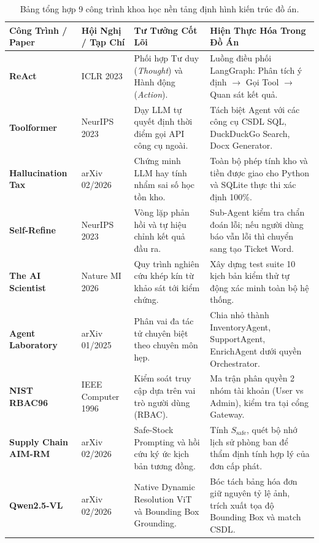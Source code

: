 \documentclass[11pt,a4paper]{article}
\begin{document}
\begin{table}[H]
\centering
\footnotesize
\renewcommand{\arraystretch}{1.2}
\begin{tabularx}{\textwidth}{p{3.2cm} l p{3.8cm} >{\raggedright\arraybackslash}X}
\toprule
\textbf{Công Trình / Paper} & \textbf{Hội Nghị / Tạp Chí} & \textbf{Tư Tưởng Cốt Lõi} & \textbf{Hiện Thực Hóa Trong Đồ Án} \\
\midrule
\textbf{ReAct} \cite{react2023} & ICLR 2023 & Phối hợp Tư duy (\textit{Thought}) và Hành động (\textit{Action}). & Luồng điều phối LangGraph: Phân tích ý định $\rightarrow$ Gọi Tool $\rightarrow$ Quan sát kết quả. \\
\textbf{Toolformer} \cite{toolformer2023} & NeurIPS 2023 & Dạy LLM tự quyết định thời điểm gọi API công cụ ngoài. & Tách biệt Agent với các công cụ CSDL SQL, DuckDuckGo Search, Docx Generator. \\
\textbf{Hallucination Tax} \cite{hallucinationtax2026} & arXiv 02/2026 & Chứng minh LLM hay tính nhẩm sai số học tồn kho. & Toàn bộ phép tính kho và tiền được giao cho Python và SQLite thực thi xác định 100\%. \\
\textbf{Self-Refine} \cite{selfrefine2023} & NeurIPS 2023 & Vòng lặp phản hồi và tự hiệu chỉnh kết quả đầu ra. & Sub-Agent kiểm tra chẩn đoán lỗi; nếu người dùng báo vẫn lỗi thì chuyển sang tạo Ticket Word. \\
\textbf{The AI Scientist} \cite{aiscientist2026} & Nature MI 2026 & Quy trình nghiên cứu khép kín từ khảo sát tới kiểm chứng. & Xây dựng test suite 10 kịch bản kiểm thử tự động xác minh toàn bộ hệ thống. \\
\textbf{Agent Laboratory} \cite{agentlab2025} & arXiv 01/2025 & Phân vai đa tác tử chuyên biệt theo chuyên môn hẹp. & Chia nhỏ thành InventoryAgent, SupportAgent, EnrichAgent dưới quyền Orchestrator. \\
\textbf{NIST RBAC96} \cite{rbac1996} & IEEE Computer 1996 & Kiểm soát truy cập dựa trên vai trò người dùng (RBAC). & Ma trận phân quyền 2 nhóm tài khoản (User vs Admin), kiểm tra tại cổng Gateway. \\
\textbf{Supply Chain AIM-RM} \cite{supplychain2026} & arXiv 02/2026 & Safe-Stock Prompting và hồi cứu ký ức kịch bản tương đồng. & Tính $S_{\text{safe}}$, quét bộ nhớ lịch sử phòng ban để thẩm định tính hợp lý của đơn cấp phát. \\
\textbf{Qwen2.5-VL} \cite{qwen25vl2026} & arXiv 02/2026 & Native Dynamic Resolution ViT và Bounding Box Grounding. & Bóc tách bảng hóa đơn giữ nguyên tỷ lệ ảnh, trích xuất tọa độ Bounding Box và match CSDL. \\
\bottomrule
\end{tabularx}
\caption{Bảng tổng hợp 9 công trình khoa học nền tảng định hình kiến trúc đồ án.}
\end{table}
\end{document}
